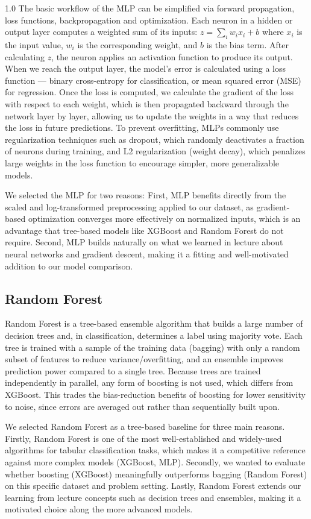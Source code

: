 \begin{spacing}{1.0}
The basic workflow of the MLP can be simplified via forward propagation, loss functions, backpropagation and optimization. Each neuron in a hidden or output layer computes a weighted sum of its inputs: $z = \sum_i w_i x_i + b$ where \(x_i\) is the input value, \(w_i\) is the corresponding weight, and \(b\) is the bias term. After calculating \(z\), the neuron applies an activation function to produce its output. When we reach the output layer, the model's error is calculated using a loss function — binary cross-entropy for classification, or mean squared error (MSE) for regression. Once the loss is computed, we calculate the gradient of the loss with respect to each weight, which is then propagated backward through the network layer by layer, allowing us to update the weights in a way that reduces the loss in future predictions. To prevent overfitting, MLPs commonly use regularization techniques such as dropout, which randomly deactivates a fraction of neurons during training, and L2 regularization (weight decay), which penalizes large weights in the loss function to encourage simpler, more generalizable models.

We selected the MLP for two reasons: First, MLP benefits directly from the scaled and log-transformed preprocessing applied to our dataset, as gradient-based optimization converges more effectively on normalized inputs, which is an advantage that tree-based models like XGBoost and Random Forest do not require. Second, MLP builds naturally on what we learned in lecture about neural networks and gradient descent, making it a fitting and well-motivated addition to our model comparison. 
\subsection{Random Forest}

Random Forest \cite{breiman_rf} is a tree-based ensemble algorithm that builds a large number of decision trees and, in classification, determines a label using majority vote. Each tree is trained with a sample of the training data (bagging) with only a random subset of features to reduce variance/overfitting, and an ensemble improves prediction power compared to a single tree. Because trees are trained independently in parallel, any form of boosting is not used, which differs from XGBoost. This trades the bias-reduction benefits of boosting for lower sensitivity to noise, since errors are averaged out rather than sequentially built upon.

We selected Random Forest as a tree-based baseline for three main reasons. Firstly, Random Forest is one of the most well-established and widely-used algorithms for tabular classification tasks, which makes it a competitive reference against more complex models (XGBoost, MLP). Secondly, we wanted to evaluate whether boosting (XGBoost) meaningfully outperforms bagging (Random Forest) on this specific dataset and problem setting. Lastly, Random Forest extends our learning from lecture concepts such as decision trees and ensembles, making it a motivated choice along the more advanced models.


\end{spacing}
